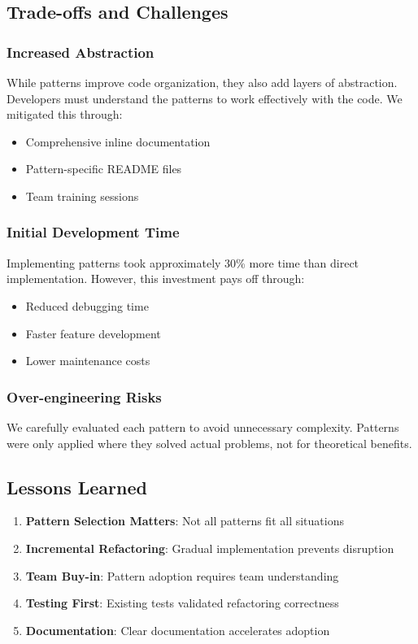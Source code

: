 \documentclass[12pt,a4paper]{article}
\begin{document}
\subsection{Trade-offs and Challenges}

\subsubsection{Increased Abstraction}
While patterns improve code organization, they also add layers of abstraction. Developers must understand the patterns to work effectively with the code. We mitigated this through:
\begin{itemize}
    \item Comprehensive inline documentation
    \item Pattern-specific README files
    \item Team training sessions
\end{itemize}

\subsubsection{Initial Development Time}
Implementing patterns took approximately 30\% more time than direct implementation. However, this investment pays off through:
\begin{itemize}
    \item Reduced debugging time
    \item Faster feature development
    \item Lower maintenance costs
\end{itemize}

\subsubsection{Over-engineering Risks}
We carefully evaluated each pattern to avoid unnecessary complexity. Patterns were only applied where they solved actual problems, not for theoretical benefits.

\subsection{Lessons Learned}

\begin{enumerate}
    \item \textbf{Pattern Selection Matters}: Not all patterns fit all situations
    \item \textbf{Incremental Refactoring}: Gradual implementation prevents disruption
    \item \textbf{Team Buy-in}: Pattern adoption requires team understanding
    \item \textbf{Testing First}: Existing tests validated refactoring correctness
    \item \textbf{Documentation}: Clear documentation accelerates adoption
\end{enumerate}
\end{document}
